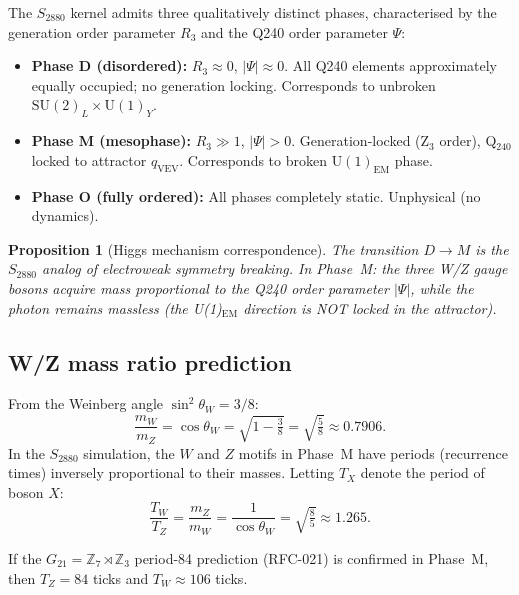 \documentclass[11pt,a4paper]{article}
\newtheorem{proposition}[theorem]{Proposition}
\theoremstyle{remark}
\begin{document}
The $S_{2880}$ kernel admits three qualitatively distinct phases, characterised by
the generation order parameter $R_3$ and the Q240 order parameter $\Psi$:
\begin{itemize}
  \item \textbf{Phase D (disordered):} $R_3 \approx 0$, $|\Psi| \approx 0$.
        All Q240 elements approximately equally occupied; no generation locking.
        Corresponds to unbroken $\mathrm{SU}(2)_L \times \mathrm{U}(1)_Y$.
  \item \textbf{Phase M (mesophase):} $R_3 \gg 1$, $|\Psi| > 0$.
        Generation-locked (Z$_3$ order), Q$_{240}$ locked to attractor $q_{\mathrm{VEV}}$.
        Corresponds to broken $\mathrm{U}(1)_{\mathrm{EM}}$ phase.
  \item \textbf{Phase O (fully ordered):} All phases completely static.
        Unphysical (no dynamics).
\end{itemize}

\begin{proposition}[Higgs mechanism correspondence]
  The transition $D \to M$ is the $S_{2880}$ analog of electroweak symmetry breaking.
  In Phase~M: the three W/Z gauge bosons acquire mass proportional to the Q240 order
  parameter $|\Psi|$, while the photon remains massless (the U(1)$_{\mathrm{EM}}$
  direction is NOT locked in the attractor).
\end{proposition}

\subsection{W/Z mass ratio prediction}

From the Weinberg angle $\sin^2\theta_W = 3/8$:
\begin{equation}
  \frac{m_W}{m_Z} = \cos\theta_W = \sqrt{1 - \tfrac{3}{8}} = \sqrt{\tfrac{5}{8}} \approx 0.7906 .
\label{eq:WZratio_tree}
\end{equation}
In the $S_{2880}$ simulation, the $W$ and $Z$ motifs in Phase~M have periods (recurrence
times) inversely proportional to their masses.  Letting $T_X$ denote the period of boson $X$:
\begin{equation}
  \frac{T_W}{T_Z} = \frac{m_Z}{m_W} = \frac{1}{\cos\theta_W} = \sqrt{\tfrac{8}{5}} \approx 1.265 .
\label{eq:period_ratio}
\end{equation}

If the $G_{21} = \mathbb{Z}_7 \rtimes \mathbb{Z}_3$ period-84 prediction (RFC-021) is
confirmed in Phase~M, then $T_Z = 84$ ticks and $T_W \approx 106$ ticks.
\end{document}
